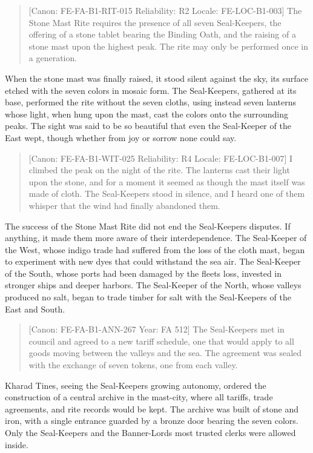 \begin{quote}
{[}Canon: FE-FA-B1-RIT-015 \textbar{} Reliability: R2 \textbar{} Locale:
FE-LOC-B1-003{]} The Stone Mast Rite requires the presence of all seven
Seal-Keepers, the offering of a stone tablet bearing the Binding Oath,
and the raising of a stone mast upon the highest peak. The rite may only
be performed once in a generation.
\end{quote}

When the stone mast was finally raised, it stood silent against the sky,
its surface etched with the seven colors in mosaic form. The
Seal-Keepers, gathered at its base, performed the rite without the seven
cloths, using instead seven lanterns whose light, when hung upon the
mast, cast the colors onto the surrounding peaks. The sight was said to
be so beautiful that even the Seal-Keeper of the East wept, though
whether from joy or sorrow none could say.

\begin{quote}
{[}Canon: FE-FA-B1-WIT-025 \textbar{} Reliability: R4 \textbar{} Locale:
FE-LOC-B1-007{]} I climbed the peak on the night of the rite. The
lanterns cast their light upon the stone, and for a moment it seemed as
though the mast itself was made of cloth. The Seal-Keepers stood in
silence, and I heard one of them whisper that the wind had finally
abandoned them.
\end{quote}

The success of the Stone Mast Rite did not end the
Seal-Keepers\textquotesingle{} disputes. If anything, it made them more
aware of their interdependence. The Seal-Keeper of the West, whose
indigo trade had suffered from the loss of the cloth mast, began to
experiment with new dyes that could withstand the sea air. The
Seal-Keeper of the South, whose ports had been damaged by the
fleet\textquotesingle s loss, invested in stronger ships and deeper
harbors. The Seal-Keeper of the North, whose valleys produced no salt,
began to trade timber for salt with the Seal-Keepers of the East and
South.

\begin{quote}
{[}Canon: FE-FA-B1-ANN-267 \textbar{} Year: FA 512{]} The Seal-Keepers
met in council and agreed to a new tariff schedule, one that would apply
to all goods moving between the valleys and the sea. The agreement was
sealed with the exchange of seven tokens, one from each valley.
\end{quote}

Kharad Tines, seeing the Seal-Keepers\textquotesingle{} growing
autonomy, ordered the construction of a central archive in the
mast-city, where all tariffs, trade agreements, and rite records would
be kept. The archive was built of stone and iron, with a single entrance
guarded by a bronze door bearing the seven colors. Only the Seal-Keepers
and the Banner-Lord\textquotesingle s most trusted clerks were allowed
inside.

